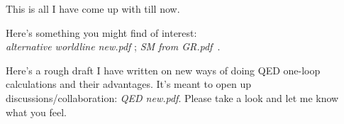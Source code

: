\begin{description}
This is all I have come up with till now.

Here's something you might find of interest: \\
\emph{alternative worldline new.pdf} ;\;
\emph{SM from GR.pdf} \,.

Here's a rough draft I have written on new ways of doing QED one-loop calculations and their advantages. It's meant to open up discussions/collaboration:
\emph{QED new.pdf}.
Please take a look and let me know what you feel.

\end{description}
